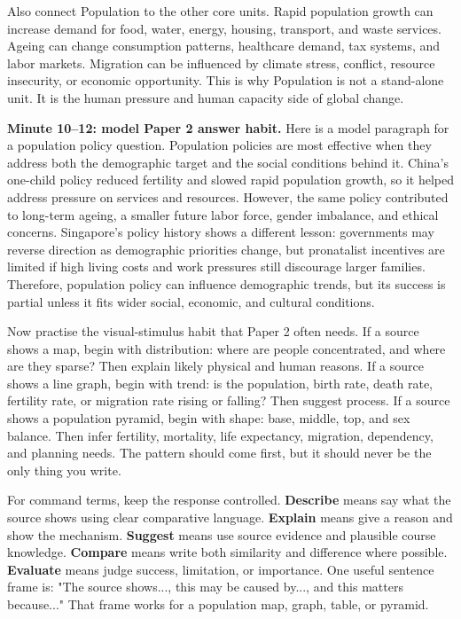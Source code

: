 \documentclass[11pt,a4paper]{article}
\newcommand{\exam}[1]{\textcolor{AccentTeal}{\textbf{#1}}}
\begin{document}
Also connect Population to the other core units. Rapid population growth can
increase demand for food, water, energy, housing, transport, and waste services.
Ageing can change consumption patterns, healthcare demand, tax systems, and
labor markets. Migration can be influenced by climate stress, conflict,
resource insecurity, or economic opportunity. This is why Population is not a
stand-alone unit. It is the human pressure and human capacity side of global
change.

\textbf{Minute 10--12: model Paper 2 answer habit.}
Here is a model paragraph for a population policy question. Population policies
are most effective when they address both the demographic target and the social
conditions behind it. China's one-child policy reduced fertility and slowed
rapid population growth, so it helped address pressure on services and
resources. However, the same policy contributed to long-term ageing, a smaller
future labor force, gender imbalance, and ethical concerns. Singapore's policy
history shows a different lesson: governments may reverse direction as
demographic priorities change, but pronatalist incentives are limited if high
living costs and work pressures still discourage larger families. Therefore,
population policy can influence demographic trends, but its success is partial
unless it fits wider social, economic, and cultural conditions.

Now practise the visual-stimulus habit that Paper 2 often needs. If a source
shows a map, begin with distribution: where are people concentrated, and where
are they sparse? Then explain likely physical and human reasons. If a source
shows a line graph, begin with trend: is the population, birth rate, death rate,
fertility rate, or migration rate rising or falling? Then suggest process. If a
source shows a population pyramid, begin with shape: base, middle, top, and sex
balance. Then infer fertility, mortality, life expectancy, migration, dependency,
and planning needs. The pattern should come first, but it should never be the
only thing you write.

For command terms, keep the response controlled. \exam{Describe} means say what
the source shows using clear comparative language. \exam{Explain} means give a
reason and show the mechanism. \exam{Suggest} means use source evidence and
plausible course knowledge. \exam{Compare} means write both similarity and
difference where possible. \exam{Evaluate} means judge success, limitation, or
importance. One useful sentence frame is: "The source shows..., this may be
caused by..., and this matters because..." That frame works for a population
map, graph, table, or pyramid.
\end{document}
